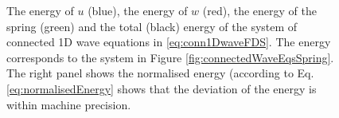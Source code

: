 \begin{figure}[h]
    \centering
      \caption{The energy of $u$ (blue), the energy of $w$ (red), the energy of the spring (green) and the total (black) energy of the system of connected 1D wave equations in \eqref{eq:conn1DwaveFDS}. The energy corresponds to the system in Figure \ref{fig:connectedWaveEqsSpring}. The right panel shows the normalised energy (according to Eq. \eqref{eq:normalisedEnergy} shows that the deviation of the energy is within machine precision. \label{fig:energyConn1DWaveSpring}}
\end{figure}

